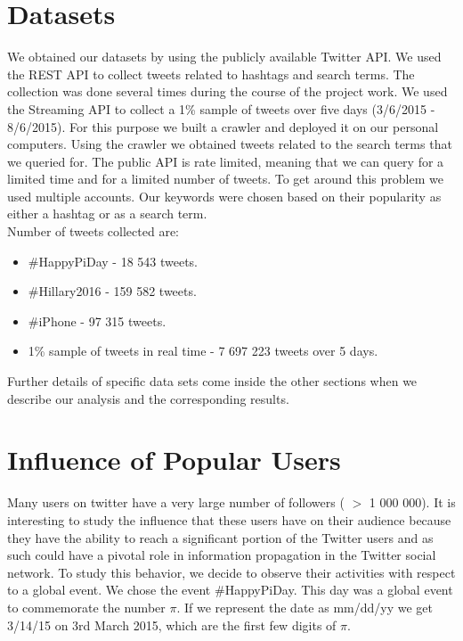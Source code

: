 \documentclass[journal, a4paper, 12pt]{article}
\begin{document}
\section{Datasets}

We obtained our datasets by using the publicly available Twitter API. We used the REST API to collect tweets related to hashtags and search terms. The collection was done several times during the course of the project work. We used the Streaming API to collect a 1\% sample of tweets over five days (3/6/2015 - 8/6/2015). For this purpose we built a crawler and deployed it on our personal computers. Using the crawler we obtained tweets related to the search terms that we queried for. The public API is rate limited, meaning that we can query for a limited time and for a limited number of tweets. To get around this problem we used multiple accounts. Our keywords were chosen based on their popularity as either a hashtag or as a search term. \\

Number of tweets collected are:
\begin{itemize}
\item \#HappyPiDay - 18 543 tweets.
\item \#Hillary2016 - 159 582 tweets.
\item \#iPhone - 97 315 tweets.
\item 1\% sample of tweets in real time - 7 697 223 tweets over 5 days.
\end{itemize}

Further details of specific data sets come inside the other sections when we describe our analysis and the corresponding results.


\section{Influence of Popular Users}

Many users on twitter have a very large number of followers ( $>$ 1 000 000). It is interesting to study the influence that these users have on their audience because they have the ability to reach a significant portion of the Twitter users and as such could have a pivotal role in information propagation in the Twitter social network. To study this behavior, we decide to observe their activities with respect to a global event. We chose the event \#HappyPiDay. This day was a global event to commemorate the number  $\pi$. If we represent the date as mm/dd/yy we get 3/14/15 on 3rd March 2015, which are the first few digits of $\pi$.
\\
\end{document}
